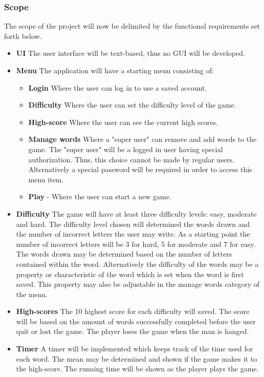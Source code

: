 \documentclass[12pt, letterpaper]{article}
\begin{document}
\subsubsection{Scope}
The scope of the project will now be delimited by the functional requirements set forth below.
\begin{itemize}
	\item \textbf{UI} The user interface will be text-based, thus no GUI will be developed.
	\item \textbf{Menu} The application will have a starting menu consisting of:
	\begin{itemize}
		\item \textbf{Login} Where the user can log in to use a saved account.
		\item \textbf{Difficulty} Where the user can set the difficulty level of the game.
		\item \textbf{High-score} Where the user can see the current high scores.
		\item \textbf{Manage words} Where a "super user" can remove and add words to the game. The "super user" will be a logged in user having special authorization. Thus, this choice cannot be made by regular users. Alternatively a special password will be required in order to access this menu item.
		\item \textbf{Play} - Where the user can start a new game.
	\end{itemize}
	\item \textbf{Difficulty} The game will have at least three difficulty levels: easy, moderate and hard. The difficulty level chosen will determined the words drawn and the number of incorrect letters the user may write. As a starting point the number of incorrect letters will be 3 for hard, 5 for moderate and 7 for easy. The words drawn may be determined based on the number of letters contained within the word. Alternatively the difficulty of the words may be a property or characteristic of the word which is set when the word is first saved. This property may also be adjustable in the manage words category of the menu.
	\item \textbf{High-scores} The 10 highest score for each difficulty will saved. The score will be based on the amount of words successfully completed before the user quit or lost the game. The player loses the game when the man is hanged.
	\item \textbf{Timer} A timer will be implemented which keeps track of the time used for each word. The mean may be determined and shown if the game makes it to the high-score. The running time will be shown as the player plays the game.

\end{itemize}
\end{document}

